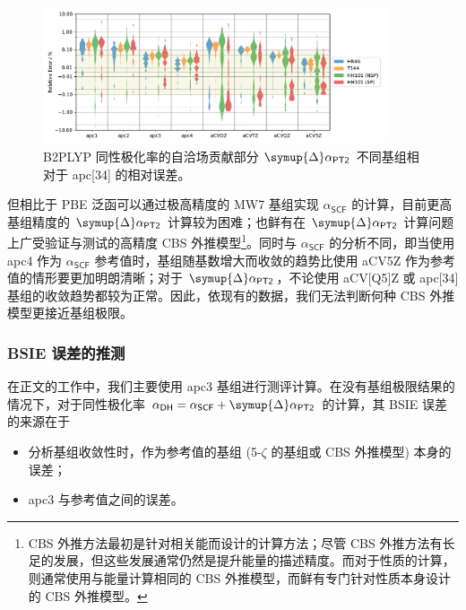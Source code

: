 \begin{figure}[!ht]
    \centering
    \includegraphics[width=0.9\textwidth]{assets/converg-b2p-pt2-apc4.pdf}
    \caption[B2PLYP $\symup{\Delta} \alpha_\textsf{PT2}$ 不同基组相对于 apc\text{[34]} 的相对误差]{B2PLYP 同性极化率的自洽场贡献部分 $\symup{\Delta} \alpha_\textsf{PT2}$ 不同基组相对于 apc[34] 的相对误差。}
    \label{fig.6.converg-b2p-pt2-apc4}
\end{figure}

但相比于 PBE 泛函可以通过极高精度的 MW7 基组实现 $\alpha_\textsf{SCF}$ 的计算，目前更高基组精度的 $\symup{\Delta} \alpha_\textsf{PT2}$ 计算较为困难；也鲜有在 $\symup{\Delta} \alpha_\textsf{PT2}$ 计算问题上广受验证与测试的高精度 CBS 外推模型\footnote{CBS 外推方法最初是针对相关能而设计的计算方法\cite{Nyden-Petersson.JCP.1981}；尽管 CBS 外推方法有长足的发展\cite{Peterson-Dunning.JCP.1994, Nyden-Petersson.JCP.1981, Petersson-Mantzaris.JCP.1988, Jensen-Jensen.TCA.2005, Karton-Martin.TCA.2006, Klopper-Kutzelnigg.JMST.1986, Kutzelnigg-Morgan.JCP.1992, Martin-Martin.CPL.1996, Helgaker-Noga.JCP.1997, Halkier-Wilson.CPL.1998, Halkier-Olsen.CPL.1999}，但这些发展通常仍然是提升能量的描述精度。而对于性质的计算，则通常使用与能量计算相同的 CBS 外推模型\cite{Monten-Deleuze.MP.2011, Huzak-Deleuze.JCP.2013, Hait-Head-Gordon.JCTC.2018, Hait-Head-Gordon.PCCP.2018}，而鲜有专门针对性质本身设计的 CBS 外推模型。}。同时与 $\alpha_\textsf{SCF}$ 的分析不同，即当使用 apc4 作为 $\alpha_\textsf{SCF}$ 参考值时，基组随基数增大而收敛的趋势比使用 aCV5Z 作为参考值的情形要更加明朗清晰；对于 $\symup{\Delta} \alpha_\textsf{PT2}$，不论使用 aCV[Q5]Z 或 apc[34] 基组的收敛趋势都较为正常。因此，依现有的数据，我们无法判断何种 CBS 外推模型更接近基组极限。

\subsubsection{BSIE 误差的推测}

在正文的工作中，我们主要使用 apc3 基组进行测评计算。在没有基组极限结果的情况下，对于同性极化率 $\alpha_\textsf{DH} = \alpha_\textsf{SCF} + \symup{\Delta} \alpha_\textsf{PT2}$ 的计算，其 BSIE 误差的来源在于
\begin{itemize}[nosep]
    \item 分析基组收敛性时，作为参考值的基组 (5-$\zeta$ 的基组或 CBS 外推模型) 本身的误差；
    \item apc3 与参考值之间的误差。
\end{itemize}


